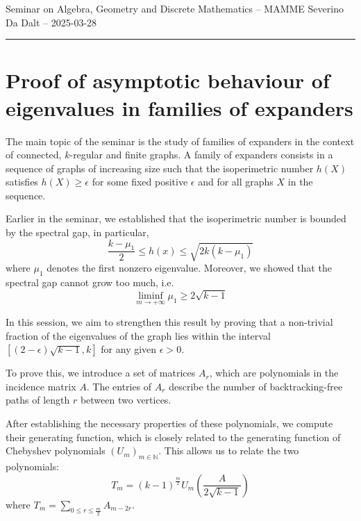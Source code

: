 \documentclass[11pt]{article}
\theoremstyle{definition}
\begin{document}
    {\Large Seminar on Algebra, Geometry and Discrete Mathematics -- MAMME}
    \newline
    {Severino Da Dalt -- 2025-03-28}

    \vspace{0.5cm}

    \hrule

    \vspace{0.5cm}

    \section*{Proof of asymptotic behaviour of eigenvalues in families of expanders}\label{sec:section}
    The main topic of the seminar is the study of families of expanders in the context of connected, $k$-regular and finite graphs.
    A family of expanders consists in a sequence of graphs of increasing size such that the isoperimetric number $h(X)$ satisfies $h(X) \geq \epsilon$
    for some fixed positive $\epsilon$ and for all graphs $X$ in the sequence.
    \newline

    Earlier in the seminar, we established that the isoperimetric number is bounded by the spectral gap, in particular,
    $$\frac{k - \mu_1}{2} \leq h(x) \leq \sqrt{2k(k - \mu_1)}$$
    where $\mu_1$ denotes the first nonzero eigenvalue.
    Moreover, we showed that the spectral gap cannot grow too much, i.e.
    $$\liminf\limits_{m \rightarrow +\infty}\mu_1 \geq 2 \sqrt{k-1}$$

    In this session, we aim to strengthen this result by proving that a non-trivial fraction of the eigenvalues of the
    graph lies within the interval $[(2 - \epsilon) \sqrt{k-1}, k]$ for any given $\epsilon > 0$.
    \newline

    To prove this, we introduce a set of matrices $A_r$, which are polynomials in the incidence matrix $A$.
    The entries of $A_r$ describe the number of backtracking-free paths of length $r$ between two vertices.
    \newline

    After establishing the necessary properties of these polynomials, we compute their generating function, which is
    closely related to the generating function of Chebyshev polynomials $(U_m)_{m\in \mathbb{N}}$.
    This allows us to relate the two polynomials:
    \begin{equation}
        \label{eq:relation_T_U}
    T_m = (k-1)^{\frac{m}{2}} U_m\left(\frac{A}{2 \sqrt{k-1}}\right)
    \end{equation}
    where $T_m = \sum_{0 \leq r \leq \frac{m}{2}} A_{m-2r}$.
    \newline
\end{document}
